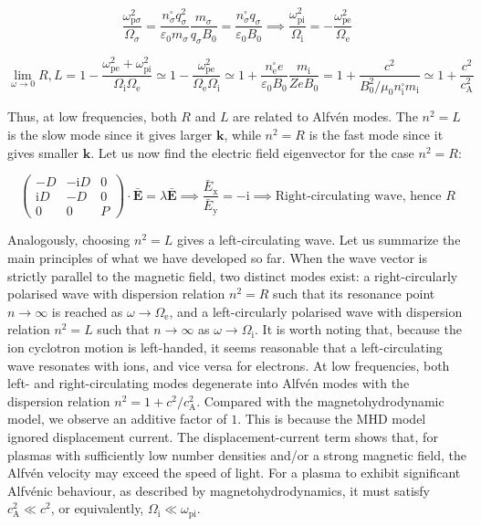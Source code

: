 \begin{equation}
    \frac{\omega_{\mathrm{p}\sigma}^2}{\Omega_\sigma}=\frac{n_\sigma^\square q_\sigma^2}{\varepsilon_0 m_\sigma}\frac{m_\sigma}{q_\sigma B_0}=\frac{n_\sigma^\square q_\sigma}{\varepsilon_0B_0}\implies \frac{\omega_\text{pi}^2}{\Omega_\mathrm{i}}=-\frac{\omega_\text{pe}^2}{\Omega_\text{e}}
\end{equation}

\begin{equation}
    \lim_{\omega\to0}R,L=1-\frac{\omega_\text{pe}^2+\omega_\text{pi}^2}{\Omega_\mathrm{i}\Omega_\text{e}}\simeq1-\frac{\omega_\text{pe}^2}{\Omega_\text{e}\Omega_\mathrm{i}}\simeq1+\frac{n_\text{e}^\square e}{\varepsilon_0 B_0}\frac{m_\mathrm{i}}{Ze B_0}=1+\frac{c^2}{B_0^2/\mu_0 n_\mathrm{i}^\square m_\mathrm{i}}\simeq1+\frac{c^2}{c_\text{A}^2}
\end{equation}

Thus, at low frequencies, both $R$ and $L$ are related to Alfvén modes. The $n^2=L$ is the slow mode since it gives larger $\mathbf{k}$, while $n^2=R$ is the fast mode since it gives smaller $\mathbf{k}$. Let us now find the electric field eigenvector for the case $n^2=R$:

\begin{equation}
    \begin{pmatrix}
        -D & -\mathrm{i}D & 0\\
        \mathrm{i}D & -D & 0\\
        0&0&P
    \end{pmatrix}\cdot\bar{\mathbf{E}}=\lambda\bar{\mathbf{E}}\implies\frac{\bar{E}_\mathrm{x}}{\bar{E}_\mathrm{y}}=-\mathrm{i}\implies\text{Right-circulating wave, hence }R
\end{equation}

Analogously, choosing $n^2=L$ gives a left-circulating wave. Let us summarize the main principles of what we have developed so far. When the wave vector is strictly parallel to the magnetic field, two distinct modes exist: a right-circularly polarised wave with dispersion relation $n^2=R$ such that its resonance point $n\to\infty$ is reached as $\omega\to\Omega_\text{e}$, and a left-circularly polarised wave with dispersion relation $n^2=L$ such that $n\to\infty$ as $\omega\to\Omega_\mathrm{i}$. It is worth noting that, because the ion cyclotron motion is left-handed, it seems reasonable that a left-circulating wave resonates with ions, and vice versa for electrons. At low frequencies, both left- and right-circulating modes degenerate into Alfvén modes with the dispersion relation $n^2=1+c^2/c_\text{A}^2$. Compared with the magnetohydrodynamic model, we observe an additive factor of $1$. This is because the MHD model ignored displacement current. The displacement-current term shows that, for plasmas with sufficiently low number densities and/or a strong magnetic field, the Alfvén velocity may exceed the speed of light. For a plasma to exhibit significant Alfvénic behaviour, as described by magnetohydrodynamics, it must satisfy $c_\text{A}^2\ll c^2$, or equivalently, $\Omega_\mathrm{i}\ll\omega_\text{pi}$.

